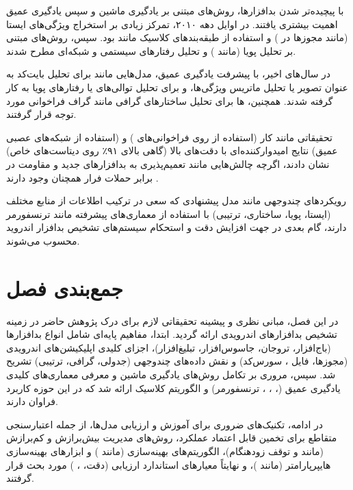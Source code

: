 با پیچیده‌تر شدن بدافزارها، روش‌های مبتنی بر یادگیری ماشین و سپس یادگیری عمیق اهمیت بیشتری یافتند. در اوایل دهه ۲۰۱۰، تمرکز زیادی بر استخراج ویژگی‌های ایستا (مانند مجوزها در  \cite{Drebin}) و استفاده از طبقه‌بندهای کلاسیک مانند  بود. سپس، روش‌های مبتنی بر تحلیل پویا (مانند ) و تحلیل رفتارهای سیستمی و شبکه‌ای مطرح شدند.

در سال‌های اخیر، با پیشرفت یادگیری عمیق، مدل‌هایی مانند  برای تحلیل بایت‌کد به عنوان تصویر یا تحلیل ماتریس ویژگی‌ها، و  برای تحلیل توالی‌های  یا رفتارهای پویا به کار گرفته شدند. همچنین، ها برای تحلیل ساختارهای گرافی مانند گراف فراخوانی مورد توجه قرار گرفتند.

تحقیقاتی مانند کار  (استفاده از  روی فراخوانی‌های ) و  (استفاده از شبکه‌های عصبی عمیق) نتایج امیدوارکننده‌ای با دقت‌های بالا (گاهی بالای ۹۱٪ روی دیتاست‌های خاص) نشان دادند، اگرچه چالش‌هایی مانند تعمیم‌پذیری به بدافزارهای جدید و مقاومت در برابر حملات فرار همچنان وجود دارند \cite{Demontis2017}.

رویکردهای چندوجهی مانند مدل پیشنهادی  که سعی در ترکیب اطلاعات از منابع مختلف (ایستا، پویا، ساختاری، ترتیبی) با استفاده از معماری‌های پیشرفته مانند ترنسفورمر دارند، گام بعدی در جهت افزایش دقت و استحکام سیستم‌های تشخیص بدافزار اندروید محسوب می‌شوند.

\section{جمع‌بندی فصل}
در این فصل، مبانی نظری و پیشینه تحقیقاتی لازم برای درک پژوهش حاضر در زمینه تشخیص بدافزارهای اندرویدی ارائه گردید. ابتدا، مفاهیم پایه‌ای شامل انواع بدافزارها (باج‌افزار، تروجان، جاسوس‌افزار، تبلیغ‌افزار)، اجزای کلیدی اپلیکیشن‌های اندرویدی (مجوزها، فایل ، سورس‌کد) و نقش داده‌های چندوجهی (جدولی، گرافی، ترتیبی) تشریح شد. سپس، مروری بر تکامل روش‌های یادگیری ماشین و معرفی معماری‌های کلیدی یادگیری عمیق (، ، ، ترنسفورمر) و الگوریتم کلاسیک  ارائه شد که در این حوزه کاربرد فراوان دارند.

در ادامه، تکنیک‌های ضروری برای آموزش و ارزیابی مدل‌ها، از جمله اعتبارسنجی متقاطع برای تخمین قابل اعتماد عملکرد، روش‌های مدیریت بیش‌برازش و کم‌برازش (مانند  و توقف زودهنگام)، الگوریتم‌های بهینه‌سازی (مانند ) و ابزارهای بهینه‌سازی هایپرپارامتر (مانند )، و نهایتاً معیارهای استاندارد ارزیابی (دقت، ، ) مورد بحث قرار گرفتند.

